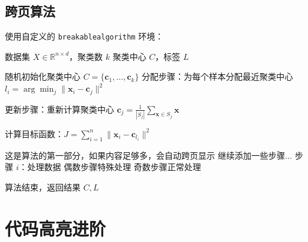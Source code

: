 \subsection{跨页算法}
使用自定义的 \texttt{breakablealgorithm} 环境：

\begin{breakablealgorithm}
  \caption{跨页算法示例}
  \begin{algorithmic}[1]
    \REQUIRE 数据集 $X \in \mathbb{R}^{n \times d}$，聚类数 $k$
    \ENSURE 聚类中心 $C$，标签 $L$
    
    \STATE 随机初始化聚类中心 $C = \{\mathbf{c}_1, \ldots, \mathbf{c}_k\}$
    \REPEAT
      \STATE 分配步骤：为每个样本分配最近聚类中心
        \STATE $l_i = \arg\min_{j} \|\mathbf{x}_i - \mathbf{c}_j\|^2$
      \ENDFOR
      
      \STATE 更新步骤：重新计算聚类中心
        \STATE $\mathbf{c}_j = \frac{1}{|S_j|} \sum_{\mathbf{x} \in S_j} \mathbf{x}$
      \ENDFOR
      
      \STATE 计算目标函数：$J = \sum_{i=1}^n \|\mathbf{x}_i - \mathbf{c}_{l_i}\|^2$
    
    \STATE 这是算法的第一部分，如果内容足够多，会自动跨页显示
    \STATE 继续添加一些步骤...
      \STATE 步骤 $i$：处理数据
        \STATE 偶数步骤特殊处理
      \ELSE
        \STATE 奇数步骤正常处理
      \ENDIF
    \ENDFOR
    
    \STATE 算法结束，返回结果
    \RETURN $C, L$
  \end{algorithmic}
\end{breakablealgorithm}

\section{代码高亮进阶}
\label{sec:code_adv}

